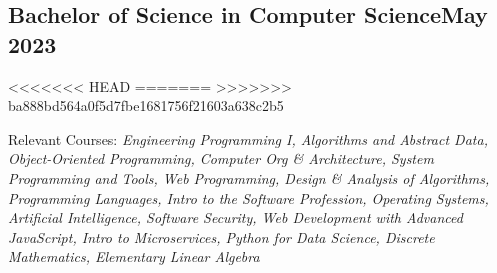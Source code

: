 \subsection{{Bachelor of Science in Computer Science\hfill May 2023}}
<<<<<<< HEAD
=======
>>>>>>> ba888bd564a0f5d7fbe1681756f21603a638c2b5
\begin{zitemize}
\item Relevant Courses: \textit{Engineering Programming I, Algorithms and Abstract Data, Object-Oriented Programming, Computer Org \& Architecture, System Programming and Tools, Web Programming, Design \& Analysis of Algorithms, Programming Languages, Intro to the Software Profession, Operating Systems, Artificial Intelligence, Software Security, Web Development with Advanced JavaScript, Intro to Microservices, Python for Data Science, Discrete Mathematics, Elementary Linear Algebra}
\end{zitemize}


